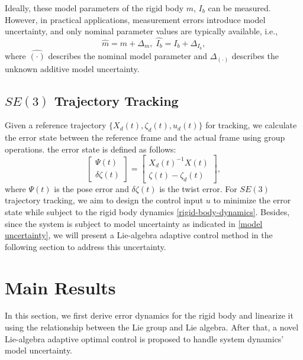 \documentclass[lettersize,journal]{IEEEtran}
\begin{document}
Ideally, these model parameters of the rigid body $m$, $I_b$ can be measured. However, in practical applications, measurement errors introduce model uncertainty, and only nominal parameter values are typically available, i.e.,
\begin{equation}\label{model uncertainty}
   \hat{m} = m  + \Delta_m, \; \hat{I_b} =I_b + \Delta_{I_b},
\end{equation}
where $\hat{(\cdot)}$ describes the nominal model parameter and $\Delta_{(\cdot)}$ describes the unknown additive model uncertainty.
\subsection{$SE(3)$ Trajectory Tracking}
Given a reference trajectory $\{X_d(t), \zeta_d(t), u_d(t)\}$ for tracking, we calculate the error state between the reference frame and the actual frame using group operations. the error state is defined as follows:
\begin{equation} \label{full-error-state}
    \begin{bmatrix}
        \Psi(t)\\ \delta\zeta(t)
    \end{bmatrix} = \begin{bmatrix}
        X_d(t)^{-1}X(t)\\ \zeta(t) - \zeta_d(t)
    \end{bmatrix},
\end{equation}
where $\Psi(t)$ is the pose error and $\delta \zeta(t)$ is the twist error. For $SE(3)$ trajectory tracking, we aim to design the control input $u$ to minimize the error state while subject to the rigid body dynamics \eqref{rigid-body-dynamics}. Besides, since the system is subject to model uncertainty as indicated in \eqref{model uncertainty}, we will present a Lie-algebra adaptive control method in the following section to address this uncertainty.
\section{Main Results}
In this section, we first derive error dynamics for the rigid body and linearize it using the relationship between the Lie group and Lie algebra. After that, a novel Lie-algebra adaptive optimal control is proposed to handle system dynamics' model uncertainty.
\end{document}
